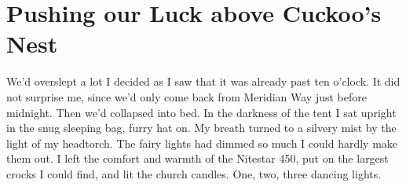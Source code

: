 \section{Pushing our Luck above Cuckoo's Nest}
\begin{marginfigure}
\end{marginfigure}
We'd overslept a lot I decided as I saw that it was already past ten o'clock. It did not surprise me, since we'd only come back from Meridian Way just before midnight. Then we'd collapsed into bed.
 In the darkness of the tent I sat upright in the snug sleeping bag, furry hat on. My breath turned to a silvery mist by the light of my headtorch. The fairy lights had dimmed so much I could hardly make them out. I left the comfort and warmth of the Nitestar 450, put on the largest crocks I could find, and lit the church candles. One, two, three dancing lights.

